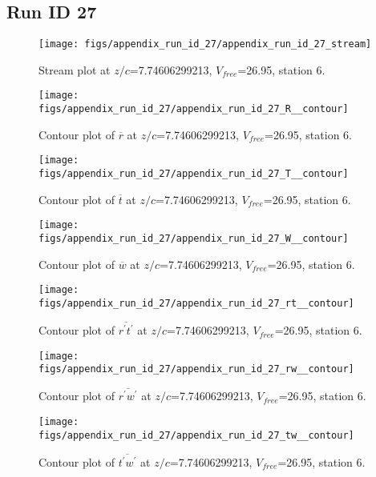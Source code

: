 \subsection{Run ID 27}
\begin{figure}[H]
\centering
\texttt{[image: figs/appendix\_run\_id\_27/appendix\_run\_id\_27\_stream]}
\caption{Stream plot at $z/c$=7.74606299213, $V_{free}$=26.95, station 6.}
\label{fig:appendix_run_id_27_stream}
\end{figure}


\begin{figure}[H]
\centering
\texttt{[image: figs/appendix\_run\_id\_27/appendix\_run\_id\_27\_R\_\_contour]}
\caption{Contour plot of $\overline{r}$ at $z/c$=7.74606299213, $V_{free}$=26.95, station 6.}
\label{fig:appendix_run_id_27_R__contour}
\end{figure}


\begin{figure}[H]
\centering
\texttt{[image: figs/appendix\_run\_id\_27/appendix\_run\_id\_27\_T\_\_contour]}
\caption{Contour plot of $\overline{t}$ at $z/c$=7.74606299213, $V_{free}$=26.95, station 6.}
\label{fig:appendix_run_id_27_T__contour}
\end{figure}


\begin{figure}[H]
\centering
\texttt{[image: figs/appendix\_run\_id\_27/appendix\_run\_id\_27\_W\_\_contour]}
\caption{Contour plot of $\overline{w}$ at $z/c$=7.74606299213, $V_{free}$=26.95, station 6.}
\label{fig:appendix_run_id_27_W__contour}
\end{figure}


\begin{figure}[H]
\centering
\texttt{[image: figs/appendix\_run\_id\_27/appendix\_run\_id\_27\_rt\_\_contour]}
\caption{Contour plot of $\overline{r^\prime t^\prime}$ at $z/c$=7.74606299213, $V_{free}$=26.95, station 6.}
\label{fig:appendix_run_id_27_rt__contour}
\end{figure}


\begin{figure}[H]
\centering
\texttt{[image: figs/appendix\_run\_id\_27/appendix\_run\_id\_27\_rw\_\_contour]}
\caption{Contour plot of $\overline{r^\prime w^\prime}$ at $z/c$=7.74606299213, $V_{free}$=26.95, station 6.}
\label{fig:appendix_run_id_27_rw__contour}
\end{figure}


\begin{figure}[H]
\centering
\texttt{[image: figs/appendix\_run\_id\_27/appendix\_run\_id\_27\_tw\_\_contour]}
\caption{Contour plot of $\overline{t^\prime w^\prime}$ at $z/c$=7.74606299213, $V_{free}$=26.95, station 6.}
\label{fig:appendix_run_id_27_tw__contour}
\end{figure}


